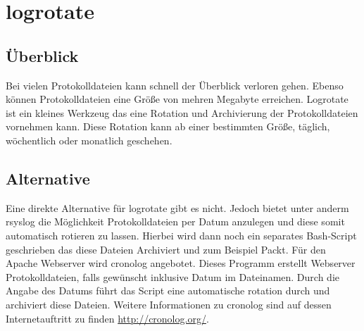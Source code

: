 \section{logrotate}
\subsection{Überblick}
Bei vielen Protokolldateien kann schnell der Überblick verloren gehen. Ebenso können Protokolldateien eine Größe von mehren Megabyte erreichen. Logrotate ist ein kleines Werkzeug das eine Rotation und Archivierung der Protokolldateien vornehmen kann. Diese Rotation kann ab einer bestimmten Größe, täglich, wöchentlich oder monatlich geschehen.

\subsection{Alternative}
Eine direkte Alternative für logrotate gibt es nicht. Jedoch bietet unter anderm rsyslog die Möglichkeit Protokolldateien per Datum anzulegen und diese somit automatisch rotieren zu lassen. Hierbei wird dann noch ein separates Bash-Script geschrieben das diese Dateien Archiviert und zum Beispiel Packt.
Für den Apache Webserver wird cronolog angebotet. Dieses Programm erstellt Webserver Protokolldateien, falls gewünscht inklusive Datum im Dateinamen. Durch die Angabe des Datums führt das Script eine automatische rotation durch und archiviert diese Dateien. Weitere Informationen zu cronolog sind auf dessen Internetauftritt zu finden \url{http://cronolog.org/}. 
